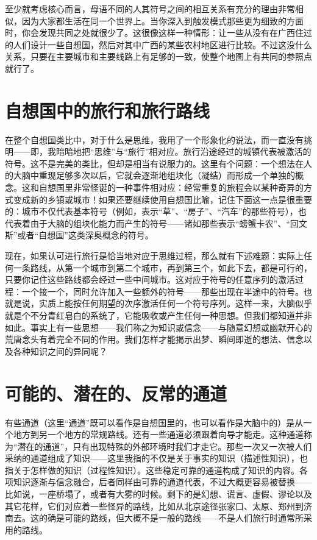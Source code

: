 至少就考虑核心而言，母语不同的人其符号之间的相互关系有充分的理由非常相似，因为大家都生活在同一个世界上。当你深入到触发模式那些更为细致的方面时，你会发现共同之处就很少了。这很像这样一种情形：让一些从没有在广西住过的人们设计一些自想国，然后对其中广西的某些农村地区进行比较。不过这没什么关系，只要在主要城市和主要线路上有足够的一致，使整个地图上有共同的参照点就行了。

\section{自想国中的旅行和旅行路线}

在整个自想国类比中，对于什么是思维，我用了一个形象化的说法，而一直没有挑明——即，我暗暗地把“思维”与“旅行”相对应。旅行沿途经过的城镇代表被激活的符号。这不是完美的类比，但却是相当有说服力的。这里有个问题：一个想法在人的大脑中重现足够多次以后，它就会逐渐地组块化（凝结）而形成一个单独的概念。这和自想国里非常怪诞的一种事件相对应：经常重复的旅程会以某种奇异的方式变成新的乡镇或城市！如果还要继续使用自想国比喻，记住下面这一点是很重要的：城市不仅代表基本符号（例如，表示“草”、“房子”、“汽车”的那些符号），也代表着由于大脑的组块化能力而产生的符号——诸如那些表示“螃蟹卡农”、“回文斯”或者“自想国”这类深奥概念的符号。

现在，如果认可进行旅行是恰当地对应于思维过程，那么就有下述难题：实际上任何一条路线，从第一个城市到第二个城市，再到第三个，如此下去，都是可行的，只要你记住这些路线都会经过一些中间城市。这对应于符号的任意序列的激活过程：一个接一个，同时允许加入一些额外的符号——那些出现在半途中的符号。也就是说，实质上能按任何期望的次序激活任何一个符号序列。这样一来，大脑似乎就是个不分青红皂白的系统了，它能吸收或产生任何一种思想。但我们都知道并非如此。事实上有一些思想——我们称之为知识或信念——与随意幻想或幽默开心的荒唐念头有着完全不同的作用。我们怎样才能揭示出梦、瞬间即逝的想法、信念以及各种知识之间的异同呢？

\section{可能的、潜在的、反常的通道}

有些通道（这里“通道”既可以看作是自想国里的，也可以看作是大脑中的）是从一个地方到另一个地方的常规路线。还有一些通道必须跟着向导才能走。这种通道称为“潜在的通道”，只有出现特殊的外部环境时我们才走它。那些一次又一次被人们采纳的通道组成了知识——这里我指的不仅是关于事实的知识（描述性知识），也指关于怎样做的知识（过程性知识）。这些稳定可靠的通道构成了知识的内容。各项知识逐渐与信念融合，后者同样由可靠的通道代表，不过大概更容易被替换——比如说，一座桥塌了，或者有大雾的时候。剩下的是幻想、谎言、虚假、谬论以及其它花样，它们对应着一些怪异的路线，比如从北京途径张家口、太原、郑州到济南去。这的确是可能的路线，但大概不是一般的路线——不是人们旅行时通常所采用的路线。

